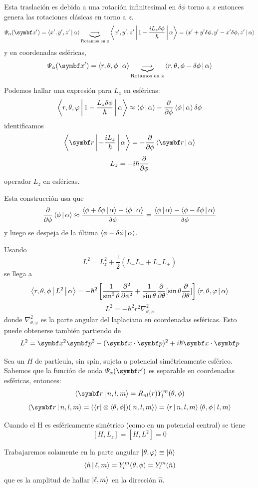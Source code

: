 \documentclass[10pt,oneside]{CBFT_book}
\begin{document}
Esta traslación es debida a una rotación infinitesimal en $\delta\phi$ torno a $z$ entonces genera las 
rotaciones clásicas en torno a $z$.
\[
	\Psi_\alpha(\vb{x}') = \Braket{x',y',z'|\alpha} \underbrace{\longrightarrow}_{\text{Rotamos en z}}
	\Braket{x',y',z'|1-\frac{iL_z\delta\phi}{\hbar}|\alpha} = \Braket{x'+y'\delta\phi,y'-x'\delta\phi,z'|\alpha}
\]
y en coordenadas esféricas,
\[
	\Psi_\alpha(\vb{x}') = \Braket{r,\theta,\phi|\alpha} 
	\underbrace{\longrightarrow}_{\text{Rotamos en z}} \Braket{r,\theta,\phi-\delta\phi|\alpha}
\]

Podemos hallar una expresión para $L_z$ en esféricas:
\[
	\Braket{r,\theta,\varphi|1-\frac{L_z\delta\phi}{\hbar}|\alpha} \approx
	\Braket{\phi|\alpha} -\dpar{}{\phi}\Braket{\phi|\alpha}\delta\phi
\]
identificamos 
\[
	\Braket{\vb{r}|-\frac{iL_z}{\hbar}|\alpha} = -\dpar{}{\phi}\Braket{\vb{r}|\alpha}
\]
\[
	L_z =  -i\hbar\dpar{}{\phi}
\]
operador $L_z$ en esféricas.

Esta construcción usa que 
\[
	\dpar{}{\phi} \Braket{\phi|\alpha} \approx 
	\frac{\Braket{\phi+\delta\phi|\alpha}-\Braket{\phi|\alpha}}{\delta\phi} =
	\frac{\Braket{\phi|\alpha} -\Braket{\phi-\delta\phi|\alpha}}{\delta\phi}
\]
y luego se despeja de la última $\Braket{\phi-\delta\phi|\alpha}$.

Usando 
\[
	L^2 = L_z^2 + \frac{1}{2}\left( L_+L_- + L_-L_+ \right)
\]
se llega a 
\[
	\Braket{r,\theta,\phi|L^2|\alpha} = -\hbar^2\left[ \frac{1}{\sin^2 \theta}\dpar[2]{}{\phi} +
	\frac{1}{\sin \theta} \dpar{}{\theta}[\sin\theta\dpar{}{\theta} ]\right]
	\Braket{r,\theta,\varphi|\alpha}
\]
\[
	L^2 = -\hbar^2 r^2 \nabla^2_{\theta,\varphi}
\]
donde $\nabla^2_{\theta,\varphi}$ es la parte angular del laplaciano en coordenadas esféricas.
Esto puede obtenerse también partiendo de 
\[
	L^2 = \vb{x}^2\vb{p}^2 - (\vb{x}\cdot\vb{p})^2 + i\hbar \vb{x}\cdot\vb{p}
\]

Sea un $H$ de partícula, sin spín, sujeta a potencial simétricamente esférico. Sabemos que la función de onda 
$\Psi_\alpha(\vb{r}')$ es separable en coordenadas esféricas, entonces:
\[
	\Braket{\vb{r}|n,l,m} = R_{nl}(r)Y_l^m(\theta,\phi)
\]
\[
	\Braket{\vb{r}|n,l,m} = (\Bra{{r}}\otimes\Bra{\theta,\phi})(\Ket{n,l,m})=
	\Braket{r|n,l,m}\Braket{\theta,\phi|l,m}
\]

Cuando el H es esféricamente simétrico (como en un potencial central) se tiene 
\[
	[H,L_z] = [H,L^2] = 0
\]

Trabajaremos solamente en la parte angular  $\Ket{\theta,\varphi} \equiv \Ket{\hat{n}}$
\[
	\Braket{\hat{n}|\ell,m} = Y_l^m(\theta,\phi) = Y_l^m(\hat{n})
\]
que es la amplitud de hallar $\Ket{\ell,m}$ en la dirección $\hat{n}$.
\end{document}
